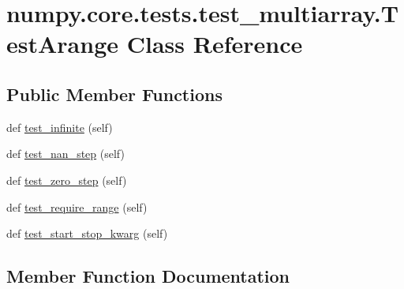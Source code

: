 \hypertarget{classnumpy_1_1core_1_1tests_1_1test__multiarray_1_1TestArange}{}\section{numpy.\+core.\+tests.\+test\+\_\+multiarray.\+Test\+Arange Class Reference}
\label{classnumpy_1_1core_1_1tests_1_1test__multiarray_1_1TestArange}
\subsection*{Public Member Functions}
\begin{DoxyCompactItemize}
\item 
def \hyperlink{classnumpy_1_1core_1_1tests_1_1test__multiarray_1_1TestArange_af73261ab2a25facbd1ccd91de751792f}{test\+\_\+infinite} (self)
\item 
def \hyperlink{classnumpy_1_1core_1_1tests_1_1test__multiarray_1_1TestArange_ad0a93b2bc46a1730d357eb8b199383a0}{test\+\_\+nan\+\_\+step} (self)
\item 
def \hyperlink{classnumpy_1_1core_1_1tests_1_1test__multiarray_1_1TestArange_a15e0f2cfe53051c52b02c93383b4356f}{test\+\_\+zero\+\_\+step} (self)
\item 
def \hyperlink{classnumpy_1_1core_1_1tests_1_1test__multiarray_1_1TestArange_a5118f534176e638178149ab78d40bb2e}{test\+\_\+require\+\_\+range} (self)
\item 
def \hyperlink{classnumpy_1_1core_1_1tests_1_1test__multiarray_1_1TestArange_a922a50dd45137aefbf6d5c705b43e96a}{test\+\_\+start\+\_\+stop\+\_\+kwarg} (self)
\end{DoxyCompactItemize}


\subsection{Member Function Documentation}
\mbox{\label{classnumpy_1_1core_1_1tests_1_1test__multiarray_1_1TestArange_af73261ab2a25facbd1ccd91de751792f}} 
